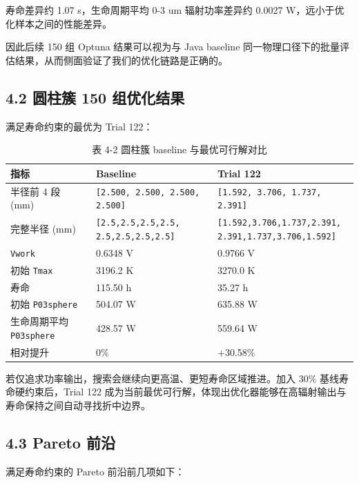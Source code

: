 \documentclass[
  a4paper,
]{ctexart}
\begin{document}
寿命差异约 1.07 s，生命周期平均 0-3 um 辐射功率差异约 0.0027
W，远小于优化样本之间的性能差异。

因此后续 150 组 Optuna 结果可以视为与 Java baseline
同一物理口径下的批量评估结果，从而侧面验证了我们的优化链路是正确的。

\subsection{4.2 圆柱簇 150
组优化结果}\label{ux5706ux67f1ux7c07-150-ux7ec4ux4f18ux5316ux7ed3ux679c}

满足寿命约束的最优为 Trial 122：


\begin{table}[H]
\centering
\caption*{表 4-2 圆柱簇 baseline 与最优可行解对比}
\scriptsize
\begin{tabularx}{\textwidth}{p{} Y Y}
\toprule
指标 & Baseline & Trial 122 \\
\midrule
半径前 4 段 (mm) & \texttt{[2.500, 2.500, 2.500, 2.500]} & \texttt{[1.592, 3.706, 1.737, 2.391]} \\
完整半径 (mm) &
\makecell[l]{\texttt{[2.5,2.5,2.5,2.5,}\\\texttt{2.5,2.5,2.5,2.5]}} &
\makecell[l]{\texttt{[1.592,3.706,1.737,2.391,}\\\texttt{2.391,1.737,3.706,1.592]}} \\
\texttt{Vwork} & 0.6348 V & 0.9766 V \\
初始 \texttt{Tmax} & 3196.2 K & 3270.0 K \\
寿命 & 115.50 h & 35.27 h \\
初始 \texttt{P03sphere} & 504.07 W & 635.88 W \\
生命周期平均 \texttt{P03sphere} & 428.57 W & 559.64 W \\
相对提升 & 0\% & +30.58\% \\
\bottomrule
\end{tabularx}
\end{table}


若仅追求功率输出，搜索会继续向更高温、更短寿命区域推进。加入 30\%
基线寿命硬约束后，Trial 122
成为当前最优可行解，体现出优化器能够在高辐射输出与寿命保持之间自动寻找折中边界。

\subsection{4.3 Pareto 前沿}\label{pareto-ux524dux6cbf}

满足寿命约束的 Pareto 前沿前几项如下：
\end{document}
